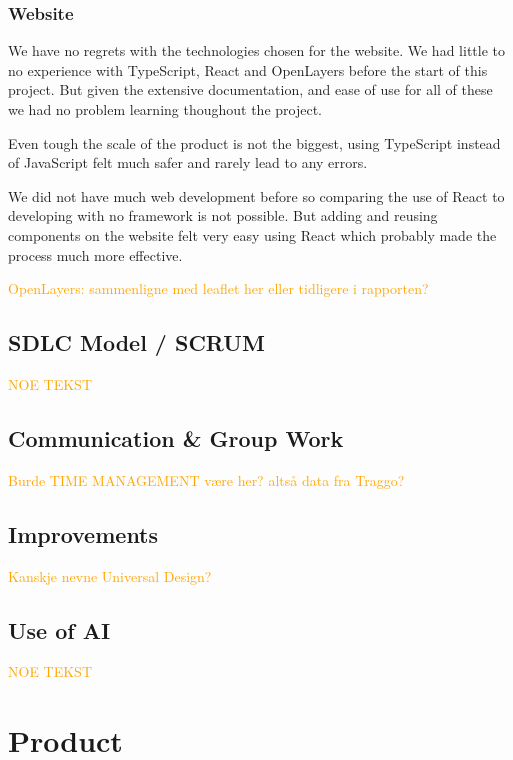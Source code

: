 \subsubsection*{Website}
We have no regrets with the technologies chosen for the website. We had little to no experience with TypeScript, React and OpenLayers before the start of this project. But given the extensive documentation, and ease of use for all of these we had no problem learning thoughout the project. 

Even tough the scale of the product is not the biggest, using TypeScript instead of JavaScript felt much safer and rarely lead to any errors. 

We did not have much web development before so comparing the use of React to developing with no framework is not possible. But adding and reusing components on the website felt very easy using React which probably made the process much more effective.

\textcolor{orange}{OpenLayers: sammenligne med leaflet her eller tidligere i rapporten?}

\subsection{SDLC Model / SCRUM}

\textcolor{orange}{NOE TEKST}

\subsection{Communication \& Group Work}

\textcolor{orange}{Burde TIME MANAGEMENT være her? altså data fra Traggo?}

\subsection{Improvements}

\textcolor{orange}{Kanskje nevne Universal Design?}

\subsection{Use of AI}

\textcolor{orange}{NOE TEKST}

\section{Product}

